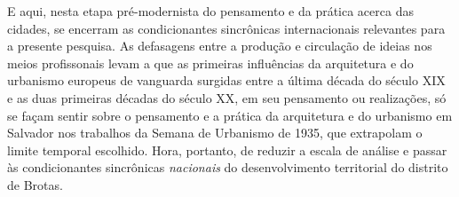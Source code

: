 E aqui, nesta etapa pré-modernista do pensamento e da prática acerca das cidades, se encerram as condicionantes sincrônicas internacionais relevantes para a presente pesquisa. As defasagens entre a produção e circulação de ideias nos meios profissonais levam a que as primeiras influências da arquitetura e do urbanismo europeus de vanguarda surgidas entre a última década do século XIX e as duas primeiras décadas do século XX, em seu pensamento ou realizações, só se façam sentir sobre o pensamento e a prática da arquitetura e do urbanismo em Salvador nos trabalhos da Semana de Urbanismo de 1935, que extrapolam o limite temporal escolhido. Hora, portanto, de reduzir a escala de análise e passar às condicionantes sincrônicas \textit{nacionais} do desenvolvimento territorial do distrito de Brotas.